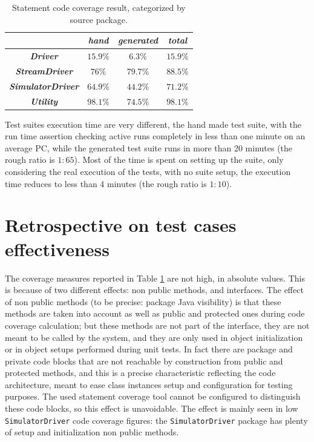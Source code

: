\documentclass{article} \usepackage{times}
\newcommand{\lil}[1]{\texttt{\lstinline|#1|}}
\begin{document}
\begin{table}[htbp]
  \caption{Statement code coverage result, categorized by source package.}
  \label{tab:statement_code_coverage}
  \begin{center}
    \begin{tabular}{|c|c|c|c|}\hline
      & \textbf{\textit{hand}} & \textbf{\textit{generated}} &
      \textbf{\textit{total}} \\\hline
      \textbf{\textit{Driver}} & $15.9 \%$ & $6.3 \%$ & $15.9 \%$ \\\hline
      \textbf{\textit{StreamDriver}} & $76 \%$ & $79.7 \%$ & $88.5 \%$ \\\hline
      \textbf{\textit{SimulatorDriver}} & $64.9 \%$ & $44.2 \%$ &
      $71.2 \%$ \\\hline
      \textbf{\textit{Utility}} & $98.1 \%$ & $74.5 \%$ & $98.1 \%$ \\\hline
    \end{tabular}
  \end{center}
\end{table}

Test suites execution time are very different, the hand made test suite, with the
run time assertion checking active runs completely in less than one
minute on an average PC, while the generated test suite runs in more
than 20 minutes (the rough ratio is $ 1 : 65 $). Most of the time is
spent on setting up the suite, only considering the real execution of
the tests, with no suite setup, the execution time reduces to less
than 4 minutes (the rough ratio is $ 1 : 10 $).



\section{Retrospective on test cases effectiveness}
\label{sec:test_cases_retrospectives}

The coverage measures reported in Table
\ref{tab:statement_code_coverage} are not high, in absolute
values. This is because of two different effects: non public methods,
and interfaces. The effect of non public methods (to be precise:
package Java visibility) is that these methods are taken into account
as well as public and protected ones during code coverage calculation;
but these methods are not part of the interface, they are not meant to
be called by the system, and they are only used in object
initialization or in object setups performed during unit tests. In
fact there are package and private code blocks that are not reachable
by construction from public and protected methods, and this is a
precise characteristic reflecting the code architecture, meant to ease
class instances setup and configuration for testing purposes. The used
statement coverage tool cannot be configured to distinguish these code
blocks, so this effect is unavoidable. The effect is mainly seen in
low \lil{SimulatorDriver} code coverage figures: the
\lil{SimulatorDriver} package has plenty of setup and initialization
non public methods.
\end{document}
